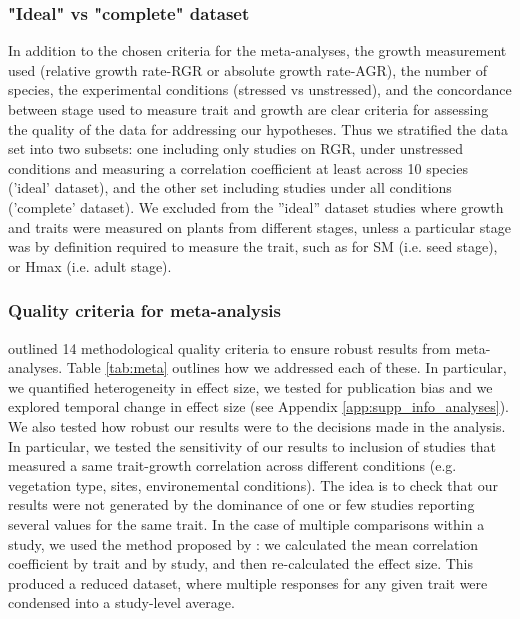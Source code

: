 \documentclass[a4paper,11pt]{article}
\begin{document}
\subsubsection*{"Ideal" vs "complete" dataset}\label{ideal-vs-complete-dataset}

In addition to the chosen criteria for the meta-analyses, the growth measurement used (relative growth rate-RGR or absolute growth rate-AGR), the number of species, the experimental conditions (stressed vs unstressed), and the concordance between stage used to measure trait and growth are clear criteria for assessing the quality of the data for addressing our hypotheses. Thus we stratified the data set into two subsets: one including only studies on RGR, under unstressed conditions and measuring a correlation coefficient at least across 10 species (’ideal’ dataset), and the other set including studies under all conditions (’complete’ dataset). We excluded from the ”ideal” dataset studies where growth and traits were measured on plants from different stages, unless a particular stage was by definition required to measure the trait, such as for SM (i.e. seed stage), or Hmax (i.e. adult stage).

\subsubsection*{Quality criteria for meta-analysis}

\cite{Koricheva:2014ku} outlined 14 methodological quality criteria to ensure robust results from meta-analyses. Table \ref{tab:meta} outlines how we addressed each of these. In particular, we quantified heterogeneity in effect size, we tested for publication bias and we explored temporal change in effect size (see Appendix \ref{app:supp_info_analyses}).
We also tested how robust our results were to the decisions made in the analysis. In particular, we tested the sensitivity of our results to inclusion of studies that measured a same trait-growth correlation across different conditions (e.g. vegetation type, sites, environemental conditions). The idea is to check that our results were not generated by the dominance of one or few studies reporting several values for the same trait. In the case of multiple comparisons within a study, we used the method proposed by \citet{Borenstein:2009um}: we calculated the mean correlation coefficient by trait and by study, and then re-calculated the effect size. This produced a reduced dataset, where multiple responses for any given trait were condensed into a study-level average.
\end{document}
